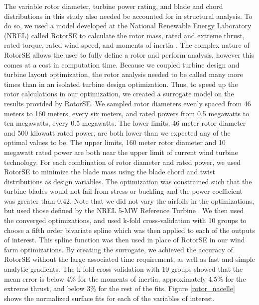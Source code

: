 \documentclass[WESD, manuscript]{copernicus}
\begin{document}
The variable rotor diameter, turbine power rating, and blade and chord distributions in this study also needed be accounted for in structural analysis.  To do so, we used a model developed at the National Renewable Energy Laboratory (NREL) called RotorSE  to calculate the rotor mass, rated and extreme thrust, rated torque, rated wind speed, and moments of inertia \citep{ning2013rotorse}. The complex nature of RotorSE allows the user to fully define a rotor and perform analysis, however this comes at a cost in computation time. Because we coupled turbine design and turbine layout optimization, the rotor analysis needed to be called many more times than in an isolated turbine design optimization. 
Thus, to speed up the rotor calculations in our optimization, we created a surrogate model on the results provided by RotorSE. We sampled rotor diameters evenly spaced from 46 meters to 160 meters, every six meters, and rated powers from 0.5 megawatts to ten megawatts, every 0.5 megawatts. The lower limits, 46 meter rotor diameter and 500 kilowatt rated power, are both lower than we expected any of the optimal values to be. The upper limits, 160 meter rotor diameter and 10 megawatt rated power are both near the upper limit of current wind turbine technology. For each combination of rotor diameter and rated power, we used RotorSE to minimize the blade mass using the blade chord and twist distributions as design variables. The optimization was constrained such that the turbine blades would not fail from stress or buckling and the power coefficient was greater than 0.42. Note that we did not vary the airfoils in the optimizations, but used those defined by the NREL 5-MW Reference Turbine \citep{jonkman2009definition}.
We then used the converged optimizations, and used k-fold cross-validation with 10 groups to choose a fifth order bivariate spline which was then applied to each of the outputs of interest. This spline function was then used in place of RotorSE in our wind farm optimizations. By creating the surrogate, we achieved the accuracy of RotorSE without the large associated time requirement, as well as fast and simple analytic gradients. 
The k-fold cross-validation with 10 groups showed that the mean error is below 4\% for the moments of inertia, approximately 4.5\% for the extreme thrust, and below 3\% for the rest of the fits. 
Figure \ref{rotor_nacelle} shows the normalized surface fits for each of the variables of interest.
\end{document}
